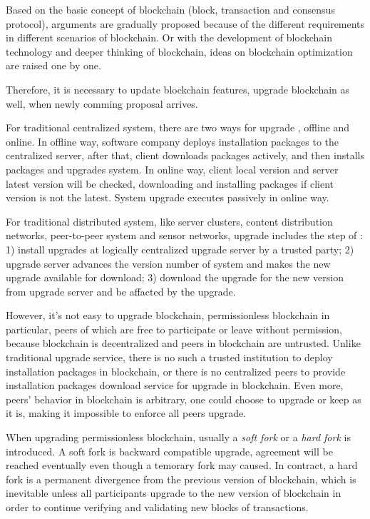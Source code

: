 \documentclass[sigplan,screen]{acmart}
\begin{document}
Based on the basic concept of blockchain (block, transaction and consensus
protocol), arguments are gradually proposed because of the different
requirements in different scenarios of blockchain.
Or with the development of blockchain technology and deeper thinking of
blockchain, ideas on blockchain optimization are raised one by one.

Therefore, it is necessary to update blockchain features, upgrade blockchain as
well, when newly comming proposal arrives.

For traditional centralized system, there are two ways for upgrade
\cite{softwareupgradewikidef}, offline and online.
In offline way, software company deploys installation packages to the
centralized server, after that, client downloads packages actively, and then
installs packages and upgrades system. In online way, client local version and
server latest version will be checked, downloading and installing packages if
client version is not the latest. System upgrade executes passively in online
way.

For traditional distributed system, like server clusters,
content distribution networks, peer-to-peer system and sensor networks,
upgrade includes the step of \cite{ajmani2003scheduling}:
1) install upgrades at logically centralized
upgrade server by a trusted party; 2) upgrade server advances the version
number of system and makes the new upgrade available for download; 3) download
the upgrade for the new version from upgrade server and be affacted by the
upgrade.

However, it's not easy to upgrade blockchain, permissionless blockchain in
particular, peers of which are free to participate or leave without permission,
because blockchain is decentralized and peers in blockchain are untrusted.
Unlike traditional upgrade service, there is no such a trusted institution to
deploy installation packages in blockchain, or there is no centralized peers to
provide installation packages download service for upgrade in blockchain.
Even more, peers' behavior in blockchain is arbitrary, one could choose to
upgrade or keep as it is, making it impossible to enforce all peers upgrade.

When upgrading permissionless blockchain, usually a \textit{soft fork} or a
\textit{hard fork} is introduced. A soft fork is backward compatible upgrade,
agreement will be reached eventually even though a temorary fork may caused.
In contract, a hard fork is a permanent divergence from the previous version of
blockchain, which is inevitable unless all participants upgrade to the new
version of blockchain in order to continue verifying and validating new blocks
of transactions.
\end{document}
